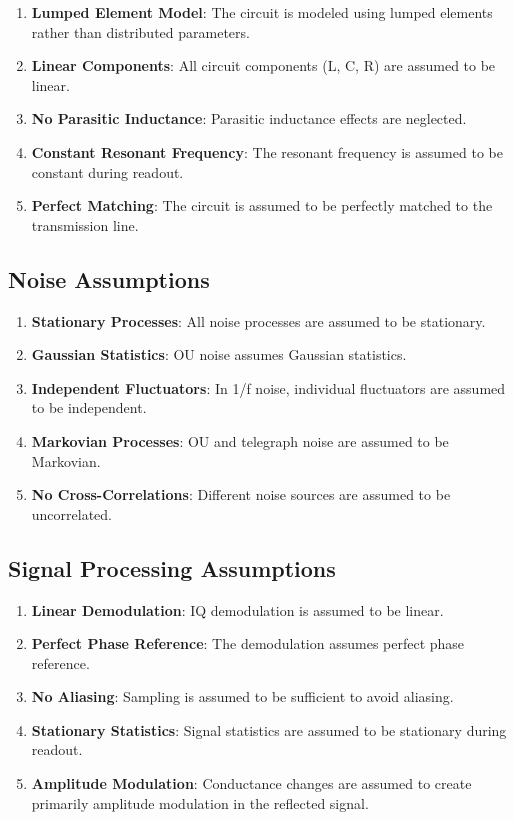 \documentclass{article}
\begin{document}
\begin{enumerate}
\item \textbf{Lumped Element Model}: The circuit is modeled using lumped elements rather than distributed parameters.
\item \textbf{Linear Components}: All circuit components (L, C, R) are assumed to be linear.
\item \textbf{No Parasitic Inductance}: Parasitic inductance effects are neglected.
\item \textbf{Constant Resonant Frequency}: The resonant frequency is assumed to be constant during readout.
\item \textbf{Perfect Matching}: The circuit is assumed to be perfectly matched to the transmission line.
\end{enumerate}

\subsection{Noise Assumptions}

\begin{enumerate}
\item \textbf{Stationary Processes}: All noise processes are assumed to be stationary.
\item \textbf{Gaussian Statistics}: OU noise assumes Gaussian statistics.
\item \textbf{Independent Fluctuators}: In 1/f noise, individual fluctuators are assumed to be independent.
\item \textbf{Markovian Processes}: OU and telegraph noise are assumed to be Markovian.
\item \textbf{No Cross-Correlations}: Different noise sources are assumed to be uncorrelated.
\end{enumerate}

\subsection{Signal Processing Assumptions}

\begin{enumerate}
\item \textbf{Linear Demodulation}: IQ demodulation is assumed to be linear.
\item \textbf{Perfect Phase Reference}: The demodulation assumes perfect phase reference.
\item \textbf{No Aliasing}: Sampling is assumed to be sufficient to avoid aliasing.
\item \textbf{Stationary Statistics}: Signal statistics are assumed to be stationary during readout.
\item \textbf{Amplitude Modulation}: Conductance changes are assumed to create primarily amplitude modulation in the reflected signal.
\end{enumerate}
\end{document}

